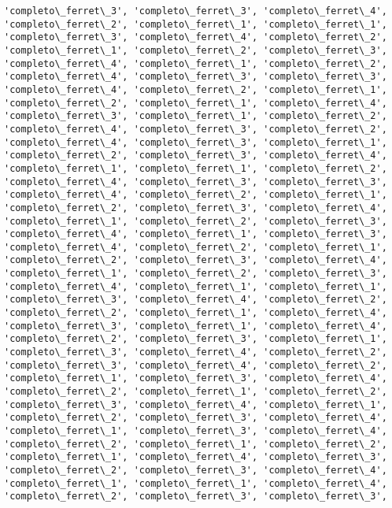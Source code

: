 \documentclass[11pt]{article}
\begin{document}
\begin{Verbatim}[commandchars=\\\{\}]
'completo\_ferret\_3', 'completo\_ferret\_3', 'completo\_ferret\_4',
'completo\_ferret\_2', 'completo\_ferret\_1', 'completo\_ferret\_1',
'completo\_ferret\_3', 'completo\_ferret\_4', 'completo\_ferret\_2',
'completo\_ferret\_1', 'completo\_ferret\_2', 'completo\_ferret\_3',
'completo\_ferret\_4', 'completo\_ferret\_1', 'completo\_ferret\_2',
'completo\_ferret\_4', 'completo\_ferret\_3', 'completo\_ferret\_3',
'completo\_ferret\_4', 'completo\_ferret\_2', 'completo\_ferret\_1',
'completo\_ferret\_2', 'completo\_ferret\_1', 'completo\_ferret\_4',
'completo\_ferret\_3', 'completo\_ferret\_1', 'completo\_ferret\_2',
'completo\_ferret\_4', 'completo\_ferret\_3', 'completo\_ferret\_2',
'completo\_ferret\_4', 'completo\_ferret\_3', 'completo\_ferret\_1',
'completo\_ferret\_2', 'completo\_ferret\_3', 'completo\_ferret\_4',
'completo\_ferret\_1', 'completo\_ferret\_1', 'completo\_ferret\_2',
'completo\_ferret\_4', 'completo\_ferret\_3', 'completo\_ferret\_3',
'completo\_ferret\_4', 'completo\_ferret\_2', 'completo\_ferret\_1',
'completo\_ferret\_2', 'completo\_ferret\_3', 'completo\_ferret\_4',
'completo\_ferret\_1', 'completo\_ferret\_2', 'completo\_ferret\_3',
'completo\_ferret\_4', 'completo\_ferret\_1', 'completo\_ferret\_3',
'completo\_ferret\_4', 'completo\_ferret\_2', 'completo\_ferret\_1',
'completo\_ferret\_2', 'completo\_ferret\_3', 'completo\_ferret\_4',
'completo\_ferret\_1', 'completo\_ferret\_2', 'completo\_ferret\_3',
'completo\_ferret\_4', 'completo\_ferret\_1', 'completo\_ferret\_1',
'completo\_ferret\_3', 'completo\_ferret\_4', 'completo\_ferret\_2',
'completo\_ferret\_2', 'completo\_ferret\_1', 'completo\_ferret\_4',
'completo\_ferret\_3', 'completo\_ferret\_1', 'completo\_ferret\_4',
'completo\_ferret\_2', 'completo\_ferret\_3', 'completo\_ferret\_1',
'completo\_ferret\_3', 'completo\_ferret\_4', 'completo\_ferret\_2',
'completo\_ferret\_3', 'completo\_ferret\_4', 'completo\_ferret\_2',
'completo\_ferret\_1', 'completo\_ferret\_3', 'completo\_ferret\_4',
'completo\_ferret\_2', 'completo\_ferret\_1', 'completo\_ferret\_2',
'completo\_ferret\_3', 'completo\_ferret\_4', 'completo\_ferret\_1',
'completo\_ferret\_2', 'completo\_ferret\_3', 'completo\_ferret\_4',
'completo\_ferret\_1', 'completo\_ferret\_3', 'completo\_ferret\_4',
'completo\_ferret\_2', 'completo\_ferret\_1', 'completo\_ferret\_2',
'completo\_ferret\_1', 'completo\_ferret\_4', 'completo\_ferret\_3',
'completo\_ferret\_2', 'completo\_ferret\_3', 'completo\_ferret\_4',
'completo\_ferret\_1', 'completo\_ferret\_1', 'completo\_ferret\_4',
'completo\_ferret\_2', 'completo\_ferret\_3', 'completo\_ferret\_3',

\end{Verbatim}
\end{document}
